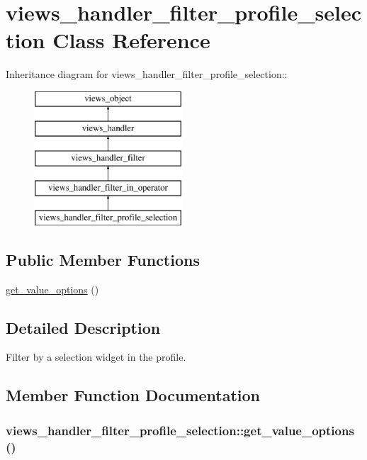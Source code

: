 \hypertarget{classviews__handler__filter__profile__selection}{
\section{views\_\-handler\_\-filter\_\-profile\_\-selection Class Reference}
\label{classviews__handler__filter__profile__selection}
}
Inheritance diagram for views\_\-handler\_\-filter\_\-profile\_\-selection::\begin{figure}[H]
\begin{center}
\leavevmode
\includegraphics[height=5cm]{classviews__handler__filter__profile__selection}
\end{center}
\end{figure}
\subsection*{Public Member Functions}
\begin{CompactItemize}
\item 
\hyperlink{classviews__handler__filter__profile__selection_83d4168bf90f6906fc4cc9db17193d0c}{get\_\-value\_\-options} ()
\end{CompactItemize}


\subsection{Detailed Description}
Filter by a selection widget in the profile. 

\subsection{Member Function Documentation}
\hypertarget{classviews__handler__filter__profile__selection_83d4168bf90f6906fc4cc9db17193d0c}{
\subsubsection[{get\_\-value\_\-options}]{\setlength{\rightskip}{0pt plus 5cm}views\_\-handler\_\-filter\_\-profile\_\-selection::get\_\-value\_\-options ()}}
\label{classviews__handler__filter__profile__selection_83d4168bf90f6906fc4cc9db17193d0c}


